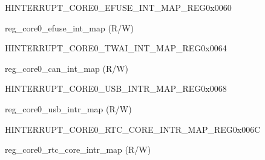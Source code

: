 \begin{register}{H}{INTERRUPT\_CORE0\_EFUSE\_INT\_MAP\_REG}{0x0060}\label{regdesc:INTERRUPTCORE0EFUSEINTMAPREG}
%
%
\regnewline%
\begin{regdesc}\begin{reglist}
\label{fielddesc:INTERRUPTCORE0EFUSEINTMAP}\item [INTERRUPT\_CORE0\_EFUSE\_INT\_MAP] reg\_core0\_efuse\_int\_map (R/W)
\end{reglist}\end{regdesc}
\end{register}


\begin{register}{H}{INTERRUPT\_CORE0\_TWAI\_INT\_MAP\_REG}{0x0064}\label{regdesc:INTERRUPTCORE0TWAIINTMAPREG}
%
%
\regnewline%
\begin{regdesc}\begin{reglist}
\label{fielddesc:INTERRUPTCORE0TWAIINTMAP}\item [INTERRUPT\_CORE0\_TWAI\_INT\_MAP] reg\_core0\_can\_int\_map (R/W)
\end{reglist}\end{regdesc}
\end{register}


\begin{register}{H}{INTERRUPT\_CORE0\_USB\_INTR\_MAP\_REG}{0x0068}\label{regdesc:INTERRUPTCORE0USBINTRMAPREG}
%
%
\regnewline%
\begin{regdesc}\begin{reglist}
\label{fielddesc:INTERRUPTCORE0USBINTRMAP}\item [INTERRUPT\_CORE0\_USB\_INTR\_MAP] reg\_core0\_usb\_intr\_map (R/W)
\end{reglist}\end{regdesc}
\end{register}


\begin{register}{H}{INTERRUPT\_CORE0\_RTC\_CORE\_INTR\_MAP\_REG}{0x006C}\label{regdesc:INTERRUPTCORE0RTCCOREINTRMAPREG}
%
%
\regnewline%
\begin{regdesc}\begin{reglist}
\label{fielddesc:INTERRUPTCORE0RTCCOREINTRMAP}\item [INTERRUPT\_CORE0\_RTC\_CORE\_INTR\_MAP] reg\_core0\_rtc\_core\_intr\_map (R/W)
\end{reglist}\end{regdesc}
\end{register}


